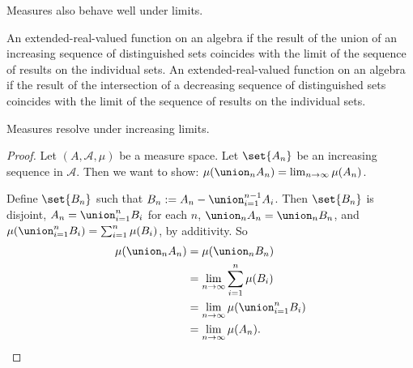 Measures also behave well under limits.

An extended-real-valued function on an algebra
if the result of the union of an increasing sequence
of distinguished sets coincides with the
limit of the sequence of results on the individual
sets.
An extended-real-valued function on an algebra
if the result of the intersection of a decreasing sequence
of distinguished sets coincides with the
limit of the sequence of results on the individual
sets.


\begin{prop}
  Measures resolve under increasing limits.
  \begin{proof}
    Let $(A, \mathcal{A}, \mu)$ be
    a measure space.
    Let $\set{A_n}$
    be an increasing sequence in $\mathcal{A}$.
    Then we want to show:
    $\mu(\union_{n} A_n) = \lim_{n \to \infty} \mu(A_n)$.

    Define $\set{B_n}$ such that
    $B_n := A_n - \union_{i = 1}^{n-1} A_i$.
    Then
    $\set{B_n}$ is disjoint,
    $A_n = \union_{i = 1}^{n} B_i$ for
    each $n$,
    $\union_n A_n = \union_n B_n$, and
    $\mu(\union_{i = 1}^{n} B_i)
    = \sum_{i = 1}^{n} \mu(B_i)$,
    by additivity.
    So
    \[
      \begin{aligned}
        \mu(\union_n A_n)
        &= \mu(\union_n B_n) \\
        &= \lim_{n \to \infty} \sum_{i = 1}^{n} \mu(B_i) \\
        &= \lim_{n \to \infty} \mu(\union_{i = 1}^{n} B_i) \\
        &= \lim_{n \to \infty} \mu(A_n).
      \end{aligned}
    \]
  \end{proof}
\end{prop}

